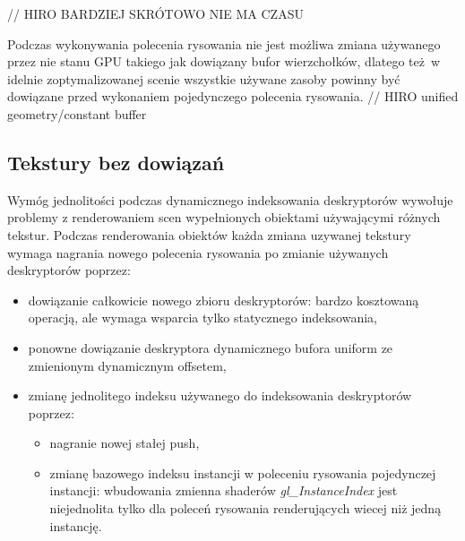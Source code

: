 // HIRO BARDZIEJ SKRÓTOWO NIE MA CZASU

Podczas wykonywania polecenia rysowania nie jest możliwa zmiana używanego przez nie stanu GPU takiego jak dowiązany bufor wierzchołków, dlatego też w idelnie zoptymalizowanej scenie wszystkie używane zasoby powinny być dowiązane przed wykonaniem pojedynczego polecenia rysowania.
// HIRO unified geometry/constant buffer


\subsection {Tekstury bez dowiązań}

Wymóg jednolitości podczas dynamicznego indeksowania deskryptorów wywołuje problemy z renderowaniem scen wypełnionych obiektami używającymi różnych tekstur.
Podczas renderowania obiektów każda zmiana uzywanej tekstury wymaga nagrania nowego polecenia rysowania po zmianie używanych deskryptorów poprzez:
\begin{itemize}
	\item dowiązanie całkowicie nowego zbioru deskryptorów: bardzo kosztowaną operacją, ale wymaga wsparcia tylko statycznego indeksowania,
	\item ponowne dowiązanie deskryptora dynamicznego bufora uniform ze zmienionym dynamicznym offsetem,
	\item zmianę jednolitego indeksu używanego do indeksowania deskryptorów poprzez:
	\begin{itemize}
		\item nagranie nowej stałej push,
		\item zmianę bazowego indeksu instancji w poleceniu rysowania pojedynczej instancji: wbudowania zmienna shaderów \textit{gl\_InstanceIndex} jest niejednolita tylko dla poleceń rysowania renderujących wiecej niż jedną instancję.
	\end{itemize}
\end{itemize}

